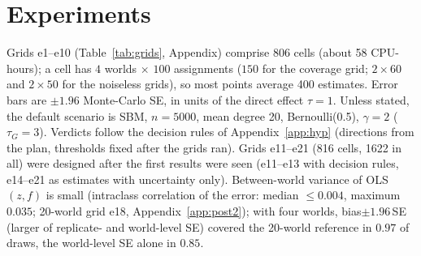 \section{Experiments}
\label{sec:results}
Grids e1--e10 (Table~\ref{tab:grids}, Appendix) comprise 806 cells (about 58 CPU-hours); a cell has $4$ worlds $\times$ $100$ assignments ($150$ for the coverage grid; $2\times60$ and $2\times50$ for the noiseless grids), so most points
average 400 estimates. Error bars are $\pm1.96$ Monte-Carlo SE, in units of the direct effect $\tau=1$. Unless stated, the default scenario is SBM, $n=5000$, mean degree 20, Bernoulli(0.5), $\gamma=2$ ($\tau_G=3$).
Verdicts follow the decision rules of Appendix~\ref{app:hyp} (directions from the plan, thresholds fixed after the grids ran). Grids e11--e21 (816 cells, 1622 in all) were designed after the first results were seen (e11--e13 with decision rules, e14--e21 as estimates with uncertainty only). Between-world variance of OLS$(z,f)$ is small (intraclass correlation of the error: median $\le0.004$, maximum $0.035$; 20-world grid e18, Appendix~\ref{app:post2}); with four worlds, bias$\pm1.96\,$SE (larger of replicate- and world-level SE) covered the 20-world reference in $0.97$ of draws, the world-level SE alone in $0.85$.

